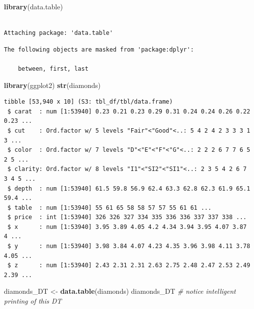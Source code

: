 \documentclass[
]{book}
\newenvironment{Shaded}{\begin{snugshade}}{\end{snugshade}}
\newcommand{\CommentTok}[1]{\textcolor[rgb]{0.56,0.35,0.01}{\textit{#1}}}
\newcommand{\KeywordTok}[1]{\textcolor[rgb]{0.13,0.29,0.53}{\textbf{#1}}}
\newcommand{\NormalTok}[1]{#1}
\newcommand{\StringTok}[1]{\textcolor[rgb]{0.31,0.60,0.02}{#1}}
\begin{document}
\begin{Shaded}
\begin{Highlighting}[]
\KeywordTok{library}\NormalTok{(data.table)}
\end{Highlighting}
\end{Shaded}

\begin{verbatim}

Attaching package: 'data.table'
\end{verbatim}

\begin{verbatim}
The following objects are masked from 'package:dplyr':

    between, first, last
\end{verbatim}

\begin{Shaded}
\begin{Highlighting}[]
\KeywordTok{library}\NormalTok{(ggplot2)}
\KeywordTok{str}\NormalTok{(diamonds)}
\end{Highlighting}
\end{Shaded}

\begin{verbatim}
tibble [53,940 x 10] (S3: tbl_df/tbl/data.frame)
 $ carat  : num [1:53940] 0.23 0.21 0.23 0.29 0.31 0.24 0.24 0.26 0.22 0.23 ...
 $ cut    : Ord.factor w/ 5 levels "Fair"<"Good"<..: 5 4 2 4 2 3 3 3 1 3 ...
 $ color  : Ord.factor w/ 7 levels "D"<"E"<"F"<"G"<..: 2 2 2 6 7 7 6 5 2 5 ...
 $ clarity: Ord.factor w/ 8 levels "I1"<"SI2"<"SI1"<..: 2 3 5 4 2 6 7 3 4 5 ...
 $ depth  : num [1:53940] 61.5 59.8 56.9 62.4 63.3 62.8 62.3 61.9 65.1 59.4 ...
 $ table  : num [1:53940] 55 61 65 58 58 57 57 55 61 61 ...
 $ price  : int [1:53940] 326 326 327 334 335 336 336 337 337 338 ...
 $ x      : num [1:53940] 3.95 3.89 4.05 4.2 4.34 3.94 3.95 4.07 3.87 4 ...
 $ y      : num [1:53940] 3.98 3.84 4.07 4.23 4.35 3.96 3.98 4.11 3.78 4.05 ...
 $ z      : num [1:53940] 2.43 2.31 2.31 2.63 2.75 2.48 2.47 2.53 2.49 2.39 ...
\end{verbatim}

\begin{Shaded}
\begin{Highlighting}[]
\NormalTok{diamonds_DT <-}\StringTok{ }\KeywordTok{data.table}\NormalTok{(diamonds)}
\NormalTok{diamonds_DT }\CommentTok{# notice intelligent printing of this DT}
\end{Highlighting}
\end{Shaded}
\end{document}
